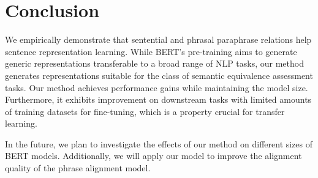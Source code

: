 \documentclass[11pt,a4paper]{article}
\begin{document}



\section{Conclusion}
We empirically demonstrate that sentential and phrasal paraphrase relations help sentence representation learning. 
While BERT's pre-training aims to generate generic representations transferable to a broad range of NLP tasks, our method generates representations suitable for the class of semantic equivalence assessment tasks. 
Our method achieves performance gains while maintaining the model size. 
Furthermore, it exhibits improvement on downstream tasks with limited amounts of training datasets for fine-tuning, which is a property crucial for transfer learning. %


In the future, we plan to investigate the effects of our method on different sizes of BERT models. 
Additionally, we will apply our model to improve the alignment quality of the phrase alignment model. 
\end{document}
